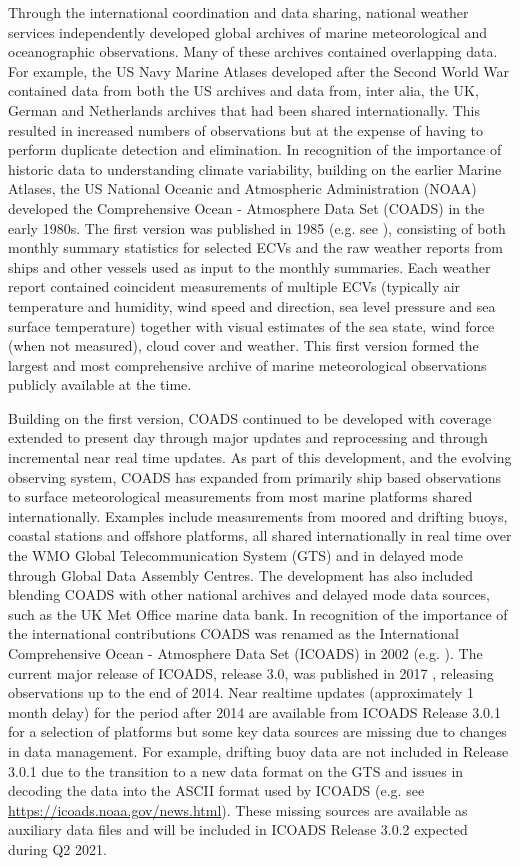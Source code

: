 Through the international coordination and data sharing, national weather services independently developed global archives of marine meteorological and oceanographic observations.
Many of these archives contained overlapping data. 
For example, the US Navy Marine Atlases developed after the Second World War contained data from both the US archives and data from, inter alia, the UK, German and Netherlands archives that had been shared internationally. 
This resulted in increased numbers of observations but at the expense of having to perform duplicate detection and elimination.
In recognition of the importance of historic data to understanding climate variability, building on the earlier Marine Atlases, the US National Oceanic and Atmospheric Administration (NOAA) developed the Comprehensive Ocean - Atmosphere Data Set (COADS) in the early 1980s.
The first version was published in 1985 (e.g. see \cite{Woodruff1987}), consisting of both monthly summary statistics for selected ECVs and the raw weather reports from ships and other vessels used as input to the monthly summaries.
Each weather report contained coincident measurements of multiple ECVs (typically air temperature and humidity, wind speed and direction, sea level pressure and sea surface temperature) together with visual estimates of the sea state, wind force (when not measured), cloud cover and weather. 
This first version formed the largest and most comprehensive archive of marine meteorological observations publicly available at the time. 

Building on the first version, COADS continued to be developed with coverage extended to present day through major updates and reprocessing and through incremental near real time updates. 
As part of this development, and the evolving observing system, COADS has expanded from primarily ship based observations to surface meteorological measurements from most marine platforms shared internationally.
Examples include measurements from moored and drifting buoys, coastal stations and offshore platforms, all shared internationally in real time over the WMO Global Telecommunication System (GTS) and in delayed mode through Global Data Assembly Centres.
The development has also included blending COADS with other national archives and delayed mode data sources, such as the UK Met Office marine data bank.
In recognition of the importance of the international contributions COADS was renamed as the International Comprehensive Ocean - Atmosphere Data Set (ICOADS) in 2002 (e.g. \cite{Worley2005}). 
The current major release of ICOADS, release 3.0, was published in 2017 \cite{Freeman2017}, releasing observations up to the end of 2014.
Near realtime updates (approximately 1 month delay) for the period after 2014 are available from ICOADS Release 3.0.1 for a selection of platforms but some key data sources are missing due to changes in data management.
For example, drifting buoy data are not included in Release 3.0.1 due to the transition to a new data format on the GTS and issues in decoding the data into the ASCII format used by ICOADS (e.g. see \url{https://icoads.noaa.gov/news.html}).
These missing sources are available as auxiliary data files and will be included in ICOADS Release 3.0.2 expected during Q2 2021. 

